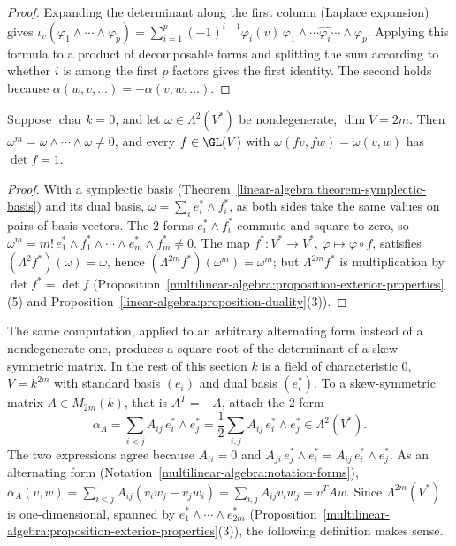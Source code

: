 \begin{proof}
Expanding the determinant along the first column (Laplace expansion) gives
$\iota_v(\varphi_1 \wedge \cdots \wedge \varphi_p) = \sum_{i=1}^p (-1)^{i-1}\varphi_i(v)\,\varphi_1 \wedge \cdots \widehat{\varphi_i} \cdots \wedge \varphi_p$.
Applying this formula to a product of decomposable forms and splitting the sum according to whether $i$ is
among the first $p$ factors gives the first identity. The second holds because $\alpha(w, v, \ldots) = -\alpha(v, w, \ldots)$.
\end{proof}

\begin{proposition}\label{multilinear-algebra:proposition-symplectic-determinant}
Suppose $\operatorname{char} k = 0$, and let $\omega \in \Lambda^2(V^*)$ be nondegenerate, $\dim V = 2m$. Then
$\omega^m = \omega \wedge \cdots \wedge \omega \neq 0$, and every $f \in \GL(V)$ with $\omega(fv, fw) = \omega(v, w)$ has $\det f = 1$.
\end{proposition}

\begin{proof}
With a symplectic basis (Theorem~\ref{linear-algebra:theorem-symplectic-basis}) and its dual basis,
$\omega = \sum_i e_i^* \wedge f_i^*$, as both sides take the same values on pairs of basis vectors. The $2$-forms
$e_i^* \wedge f_i^*$ commute and square to zero, so $\omega^m = m!\, e_1^* \wedge f_1^* \wedge \cdots \wedge e_m^* \wedge f_m^* \neq 0$.
The map $f^* \colon V^* \to V^*$, $\varphi \mapsto \varphi \circ f$, satisfies $(\Lambda^2 f^*)(\omega) = \omega$, hence
$(\Lambda^{2m}f^*)(\omega^m) = \omega^m$; but $\Lambda^{2m}f^*$ is multiplication by $\det f^* = \det f$
(Proposition~\ref{multilinear-algebra:proposition-exterior-properties}(5) and
Proposition~\ref{linear-algebra:proposition-duality}(3)).
\end{proof}

The same computation, applied to an arbitrary alternating form instead of a nondegenerate one, produces a square root of the determinant of a skew-symmetric matrix. In the rest
of this section $k$ is a field of characteristic $0$, $V = k^{2m}$ with standard basis $(e_i)$ and dual basis $(e_i^*)$. To a skew-symmetric matrix $A \in M_{2m}(k)$, that
is $A^T = -A$, attach the $2$-form
\[
\alpha_A = \sum_{i < j}A_{ij}\,e_i^* \wedge e_j^* = \frac12\sum_{i, j}A_{ij}\,e_i^* \wedge e_j^* \in \Lambda^2(V^*) .
\]
The two expressions agree because $A_{ii} = 0$ and $A_{ji}\,e_j^* \wedge e_i^* = A_{ij}\,e_i^* \wedge e_j^*$. As an alternating form (Notation~\ref{multilinear-algebra:notation-forms}),
$\alpha_A(v, w) = \sum_{i < j}A_{ij}(v_iw_j - v_jw_i) = \sum_{i, j}A_{ij}v_iw_j = v^TAw$. Since $\Lambda^{2m}(V^*)$ is one-dimensional, spanned by $e_1^* \wedge \cdots \wedge e_{2m}^*$
(Proposition~\ref{multilinear-algebra:proposition-exterior-properties}(3)), the following definition makes sense.


